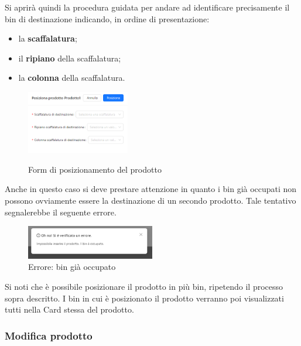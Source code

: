         \noindent Si aprirà quindi la procedura guidata per andare ad identificare precisamente il bin di destinazione indicando, in ordine di presentazione:
        \begin{itemize}
            \item la \textbf{scaffalatura};
            \item il \textbf{ripiano} della scaffalatura;
            \item la \textbf{colonna} della scaffalatura.
        \end{itemize}
        \begin{figure}[H]
            \centering
            \includegraphics[width=0.4\textwidth]{images/scelta_posizione_prodotto.png}
            \label{destinazione_prodotto}
            \caption{Form di posizionamento del prodotto}
        \end{figure}
        
        \noindent Anche in questo caso si deve prestare attenzione in quanto i bin già occupati non possono ovviamente essere la destinazione di un secondo prodotto. 
        Tale tentativo segnalerebbe il seguente errore.\\
        \begin{figure}[H]
            \centering
            \includegraphics[width=0.5\textwidth]{images/bin_occupato.png}
            \caption{Errore: bin già occupato}
        \end{figure}
        
        \noindent Si noti che è possibile posizionare il prodotto in più bin, ripetendo il processo sopra descritto. I bin in cui è posizionato il prodotto verranno poi visualizzati tutti nella Card stessa del prodotto. 
    \newpage

    \subsubsection{Modifica prodotto}\label{sec:prodotti:modifica}
